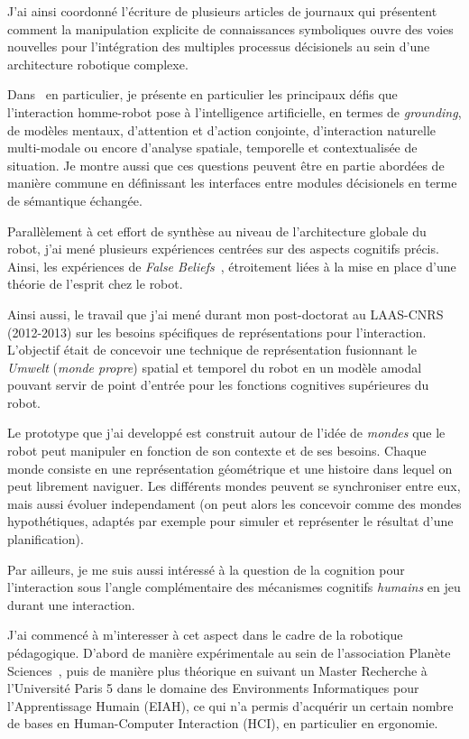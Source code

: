 \documentclass[a4paper]{article}
\begin{document}
J'ai ainsi coordonné l'écriture de plusieurs articles de journaux
\cite{alami2011when, Lemaignan2012, lemaignan2014human} qui présentent comment
la manipulation explicite de connaissances symboliques ouvre des voies nouvelles
pour l'intégration des multiples processus décisionels au sein d'une
architecture robotique complexe.

Dans~\cite{lemaignan2014human} en particulier, je présente en particulier les
principaux défis que l'interaction homme-robot pose à l'intelligence
artificielle, en termes de \emph{grounding}, de modèles mentaux, d'attention et
d'action conjointe, d'interaction naturelle multi-modale ou encore d'analyse
spatiale, temporelle et contextualisée de situation. Je montre aussi que ces
questions peuvent être en partie abordées de manière commune en définissant les
interfaces entre modules décisionels en terme de sémantique échangée.

Parallèlement à cet effort de synthèse au niveau de l'architecture globale du
robot, j'ai mené plusieurs expériences centrées sur des aspects cognitifs
précis. Ainsi, les expériences de \emph{False Beliefs}~\cite{Warnier2012a},
étroitement liées à la mise en place d'une théorie de l'esprit chez le robot.

Ainsi aussi, le travail que j'ai mené durant mon post-doctorat au LAAS-CNRS
(2012-2013) sur les besoins spécifiques de représentations pour l'interaction.
L'objectif était de concevoir une technique de représentation fusionnant le
\emph{Umwelt} (\emph{monde propre}) spatial et temporel du robot en un modèle
amodal pouvant servir de point d'entrée pour les fonctions cognitives
supérieures du robot.

Le prototype que j'ai developpé est construit autour de l'idée de \emph{mondes}
que le robot peut manipuler en fonction de son contexte et de ses besoins.
Chaque monde consiste en une représentation géométrique et une histoire dans
lequel on peut librement naviguer. Les différents mondes peuvent se synchroniser
entre eux, mais aussi évoluer independament (on peut alors les concevoir comme
des mondes hypothétiques, adaptés par exemple pour simuler et représenter le
résultat d'une planification).

Par ailleurs, je me suis aussi intéressé à la question de la cognition pour
l'interaction sous l'angle complémentaire des mécanismes cognitifs
\emph{humains} en jeu durant une interaction.

J'ai commencé à m'interesser à cet aspect dans le cadre de la robotique
pédagogique. D'abord de manière expérimentale au sein de l'association Planète
Sciences~\cite{stinckwich2007squeakbot}, puis de manière plus théorique en
suivant un Master Recherche à l'Université Paris 5 dans le domaine des
Environments Informatiques pour l'Apprentissage Humain (EIAH), ce qui n'a permis
d'acquérir un certain nombre de bases en Human-Computer Interaction (HCI), en
particulier en ergonomie.
\end{document}
